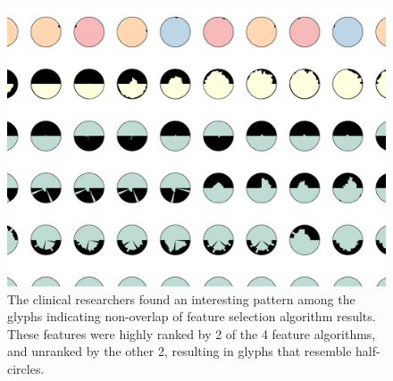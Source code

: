 \begin{figure}[t]
\centering
\includegraphics[width=\linewidth]{infuse/usecase1b}
\caption[The clinical researchers found an interesting pattern among
the glyphs.]{
The clinical researchers found an interesting pattern among
the glyphs indicating non-overlap of feature selection algorithm results.
These features were highly ranked by 2 of the 4 feature algorithms,
and unranked by the other 2, resulting in glyphs that resemble half-circles.
}
\label{fig:usecase1}
\end{figure}
